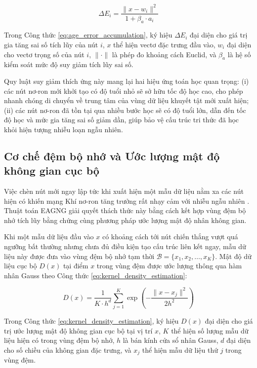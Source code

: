 \begin{equation}
\Delta E_i = \frac{\|x - w_i\|^2}{1 + \beta_a \cdot a_i}
\label{eq:age_error_accumulation}
\end{equation}

Trong Công thức \ref{eq:age_error_accumulation}, ký hiệu $\Delta E_i$ đại diện cho giá trị gia tăng sai số tích lũy của nút $i$, $x$ thể hiện vectơ đặc trưng đầu vào, $w_i$ đại diện cho vectơ trọng số của nút $i$, $\| \cdot \|$ là phép đo khoảng cách Euclid, và $\beta_a$ là hệ số kiểm soát mức độ suy giảm tích lũy sai số.

Quy luật suy giảm thích ứng này mang lại hai hiệu ứng toán học quan trọng:
(i) các nút nơ-ron mới khởi tạo có độ tuổi nhỏ sẽ sở hữu tốc độ học cao, cho phép nhanh chóng di chuyển về trung tâm của vùng dữ liệu khuyết tật mới xuất hiện;
(ii) các nút nơ-ron đã tồn tại qua nhiều bước học sẽ có độ tuổi lớn, dẫn đến tốc độ học và mức gia tăng sai số giảm dần, giúp bảo vệ cấu trúc tri thức đã học khỏi hiện tượng nhiễu loạn ngẫu nhiên.

\subsection{Cơ chế đệm bộ nhớ và Ước lượng mật độ không gian cục bộ}

Việc chèn nút mới ngay lập tức khi xuất hiện một mẫu dữ liệu nằm xa các nút hiện có khiến mạng Khí nơ-ron tăng trưởng rất nhạy cảm với nhiễu ngẫu nhiên \cite{silva2006boundary}. Thuật toán EAGNG giải quyết thách thức này bằng cách kết hợp vùng đệm bộ nhớ tích lũy bằng chứng cùng phương pháp ước lượng mật độ nhân không gian.

Khi một mẫu dữ liệu đầu vào $x$ có khoảng cách tới nút chiến thắng vượt quá ngưỡng bất thường nhưng chưa đủ điều kiện tạo cấu trúc liên kết ngay, mẫu dữ liệu này được đưa vào vùng đệm bộ nhớ tạm thời $\mathcal{B} = \{x_1, x_2, \dots, x_K\}$. Mật độ dữ liệu cục bộ $D(x)$ tại điểm $x$ trong vùng đệm được ước lượng thông qua hàm nhân Gauss theo Công thức \ref{eq:kernel_density_estimation}:

\begin{equation}
D(x) = \frac{1}{K \cdot h^d} \sum_{j=1}^{K} \exp\left( -\frac{\|x - x_j\|^2}{2h^2} \right)
\label{eq:kernel_density_estimation}
\end{equation}

Trong Công thức \ref{eq:kernel_density_estimation}, ký hiệu $D(x)$ đại diện cho giá trị ước lượng mật độ không gian cục bộ tại vị trí $x$, $K$ thể hiện số lượng mẫu dữ liệu hiện có trong vùng đệm bộ nhớ, $h$ là bán kính cửa sổ nhân Gauss, $d$ đại diện cho số chiều của không gian đặc trưng, và $x_j$ thể hiện mẫu dữ liệu thứ $j$ trong vùng đệm.

